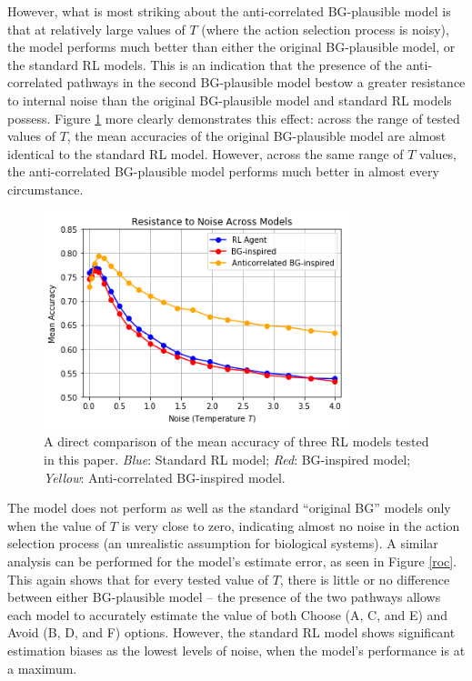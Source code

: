 \documentclass[10pt,letterpaper]{article}
\begin{document}
However, what is most striking about the anti-correlated BG-plausible model is that at relatively large values of $T$ (where the action selection process is noisy), the model performs much better than either the original BG-plausible model, or the standard RL models. This is an indication that the presence of the anti-correlated pathways in the second BG-plausible model bestow a greater resistance to internal noise than the original BG-plausible model and standard RL models possess. Figure \ref{resistance-to-noise} more clearly demonstrates this effect: across the range of tested values of $T$, the mean accuracies of the original BG-plausible model are almost identical to the standard RL model. However, across the same range of $T$ values, the anti-correlated BG-plausible model performs much better in almost every circumstance.

\begin{figure}[ht]
	\begin{center}
		\includegraphics[width=3.5in]{resistance-to-noise.png}
	\end{center}
	\caption{A direct comparison of the mean accuracy of three RL models tested in this paper. \emph{Blue}: Standard RL model; \emph{Red}: BG-inspired model; \emph{Yellow}: Anti-correlated BG-inspired model.} 
	\label{resistance-to-noise}
\end{figure}

The model does not perform as well as the standard ``original BG'' models only when the value of $T$ is very close to zero, indicating almost no noise in the action selection process (an unrealistic assumption for biological systems). A similar analysis can be performed for the model's estimate error, as seen in Figure \ref{roc}. This again shows that for every tested value of $T$, there is little or no difference between either BG-plausible model -- the presence of the two pathways allows each model to accurately estimate the value of both Choose (A, C, and E) and Avoid (B, D, and F) options. However, the standard RL model shows significant estimation biases as the lowest levels of noise, when the model's performance is at a maximum.
\end{document}
